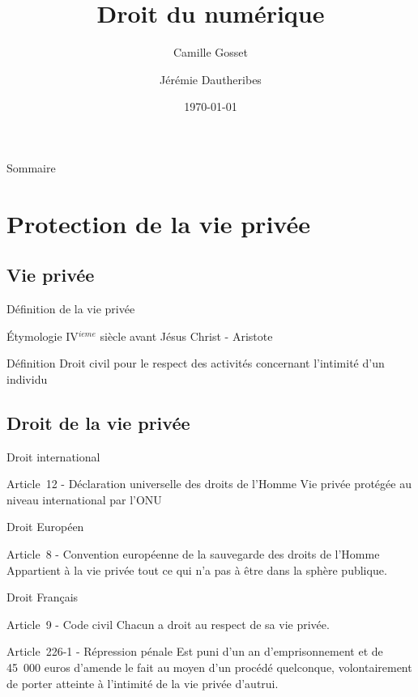 \documentclass{beamer}
\title{Droit du numérique}
\author{Camille Gosset\inst{1} \and Jérémie Dautheribes\inst{1}}
\institute[Universities of Somewhere and Elsewhere] %
{
  \inst{1}%
    \'Etudiants en deuxième année d'informatique}
\date{\today}
\begin{document}
\begin{frame}
  \titlepage
\end{frame}

\begin{frame}{Sommaire}
  \tableofcontents
\end{frame}


\section{Protection de la vie privée}
\subsection{Vie privée}
\begin{frame}{Définition de la vie privée}
\begin{block}{Étymologie}
IV$^{ieme}$ siècle avant Jésus Christ - Aristote
\end{block}
\vspace{0.5cm}
\begin{block}{Définition}
Droit civil pour le respect des activités concernant l’intimité d’un individu
\end{block}
\end{frame}

\subsection{Droit de la vie privée}

\begin{frame}{Droit international}
  \begin{block}{Article~12 - Déclaration universelle des droits de l'Homme}
Vie privée protégée au niveau international par l'ONU
  \end{block}
\end{frame}

\begin{frame}{Droit Européen}
  \begin{block}{Article~8 - Convention européenne de la sauvegarde des droits de l'Homme}
Appartient à la vie privée tout ce qui n'a pas à être dans la sphère publique.
  \end{block}
\end{frame}

\begin{frame}{Droit Français}
  \begin{block}{Article~9 -  Code civil}
Chacun a droit au respect de sa vie privée.
  \end{block}
  \begin{block}{Article~226-1 - Répression pénale}
Est puni d'un an d'emprisonnement et de 45~000 euros d'amende le fait au moyen d'un procédé quelconque, volontairement de porter atteinte à l'intimité de la vie privée d'autrui.
  \end{block}
\end{frame}
\end{document}
